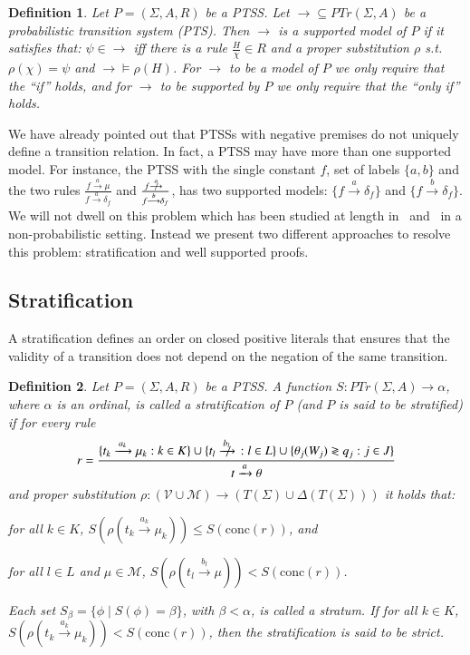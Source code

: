 \documentclass[submission,copyright,creativecommons]{eptcs}
\newtheorem{definition}{Definition}
\newcommand{\ddedrule}[2]{\frac{\displaystyle #1}{\displaystyle #2}}
\newcommand{\trans}[1][]{\xrightarrow{\, {#1} \, }}
\newcommand{\ntrans}[1][]{\mathrel{{\trans[#1]}\makebox[0em][r]{$\not$\hspace{2ex}}}{\!}}
\newcommand{\strans}[1][]{\stackrel{#1}{\longrightarrow}}
\newcommand{\closedTerms}{T(\Sigma)}
\newcommand{\PTrn}{\textit{PTr}}
\newcommand{\PTr}{\PTrn(\Sigma, A)}
\newcommand{\conc}[1]{\textrm{conc}(#1)}
\newcommand{\TVar}{\mathcal{V}}
\newcommand{\M}{\mathcal{M}}
\begin{document}
\begin{definition}\label{def:supmodel}Let $P = (\Sigma, A, R)$ be a PTSS. Let ${\trans} \subseteq \PTr$ be
  a probabilistic transition system (PTS). Then ${\trans}$ is \emph{a
   supported model of} $P$ if
it satisfies that: $\psi \in {\trans}$ iff there is a rule
  $\frac{H}{\chi} \in R$ and a proper substitution $\rho$
  s.t.\ $\rho(\chi) = \psi$ and ${\trans} \models \rho (H)$.
For ${\trans}$ to be a \emph{model} of $P$ we only require that
   the ``if'' holds, and for ${\trans}$ to be
   \emph{supported by} $P$ we only require that the ``only if'' holds.
\end{definition}

We have already pointed out that PTSSs with negative premises do not
uniquely define a transition relation.  In fact, a PTSS may have more
than one supported model.  For instance, the PTSS with the single
constant $f$, set of labels $\{a,b\}$ and the two rules
$\frac{ f \strans[a] \mu}{ f \strans[a] \delta_{f}}$ and
$\frac{ f \strans[a]\!\!\!\!\!\!\not \quad }{ f \strans[b] \delta_{f}}$,
has two supported models: $\{f\trans[a]\delta_{f}\}$ and
$\{f\trans[b]\delta_{f}\}$.
We will not dwell on this problem which has been studied at length
in~\cite{BolGroote96} and~\cite{vanGlabbeek04} in a non-probabilistic
setting.
Instead we present two different approaches to resolve this problem:
stratification and well supported proofs. 



\subsection{Stratification}\label{sec:stratification}
A stratification defines an order on closed positive literals that
ensures that the validity of a transition does
not depend on the negation of the same transition.

\begin{definition}\label{def:stratification}Let $P = (\Sigma, A, R)$ be a PTSS.  A function $S: \PTr \to
  \alpha$, where $\alpha$ is an ordinal, is called a
  \emph{stratification} of $P$ (and $P$ is said to be
  \emph{stratified}) if for every rule
\[r = \ddedrule{\{t_k \trans[a_k] \mu_k : k\in K \}\cup \{t_l \ntrans[b_l]
    : l \in L\} \cup \{\theta_j (W_j) \gtrless q_j : j \in J\} } 
{t \trans[a] \theta }\]
and proper substitution
$\rho : (\TVar\cup\M) \to (\closedTerms\cup\Delta(\closedTerms))$
it holds that:
\begin{inparaenum}[(i)]
  \item for all $k \in K$, $S(\rho (t_k \trans[a_k] \mu_k)) \leq
    S(\conc{r})$, and
  \item for all $l \in L$ and $\mu \in \M$, $S(\rho (t_l \trans[b_l] \mu))
    < S(\conc{r}) $.
  \end{inparaenum}
Each set $S_{\beta} = \{\phi \mid S(\phi)=\beta\}$, with
  $\beta<\alpha$, is called a \emph{stratum}.
If for all $k \in K$, $S(\rho(t_k\trans[a_k]\mu_k)) < S(\conc{r})$,
  then the stratification is said to be \emph{strict}.
\end{definition}
\end{document}
